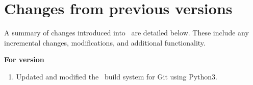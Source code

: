 \section{Changes from previous versions}

A summary of changes introduced into \SPM\ are detailed below. These include any incremental changes, modifications, and additional functionality.

\textbf{For version \SPM\ \VER}

\begin{enumerate}
  \item Updated and modified the \SPM\ build system for Git using Python3.
\end{enumerate}

